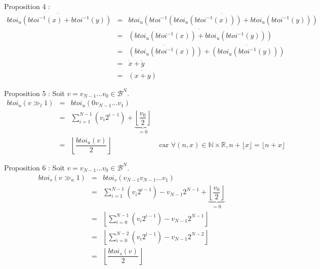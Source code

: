\documentclass[../main.tex]{subfiles}
\begin{document}
Proposition 4 :
\[
\begin{array}{lcl}
\dot{btoi_{u}(btoi^{-1}(x) + btoi^{-1}(y))} & = & \dot{btoi_{u}(btoi^{-1}(btoi_{u}(btoi^{-1}(x))) + btoi_{u}(btoi^{-1}(y)))} \\
 & = & \dot{(btoi_{u}(btoi^{-1}(x)) + btoi_{u}(btoi^{-1}(y)))} \\
 & = & \dot{(btoi_{u}(btoi^{-1}(x)))} + \dot{(btoi_{u}(btoi^{-1}(y)))} \\
 & = & \dot{x} + \dot{y} \\
 & = & \dot{(x + y)}
\end{array}
\]

Proposition 5 : Soit $v = v_{N-1}\dots v_{0}\in{\mathcal{B}^{N}}$.
\[
\begin{array}{lcll}
btoi_{u}(v\gg_{l}1)  & = & btoi_{u}(0v_{N-1}\dots v_{1}) \\
& = & \displaystyle\sum_{i = 1}^{N-1}(v_{i}2^{i-1}) + \underbrace{\left\lfloor\dfrac{v_{0}}{2}\right\rfloor}_{=0} \\
& = &  \left\lfloor\dfrac{btoi_{u}(v)}{2}\right\rfloor & \text{ car $\forall{(n, x)}\in{\mathbb{N}\times{\mathbb{R}}}, n + \lfloor{x}\rfloor = \lfloor{n + x}\rfloor$}
\end{array}
\]

Proposition 6 : Soit $v = v_{N-1}\dots v_{0}\in{\mathcal{B}^{N}}$.
\[
\begin{array}{lcl}
btoi_{s}(v\gg_{a}1)  & = & btoi_{s}(v_{N-1}v_{N-1}\dots v_{1}) \\
& = & \displaystyle\sum_{i = 1}^{N-1}(v_{i}2^{i-1}) - v_{N-1}2^{N-1} + \underbrace{\left\lfloor\dfrac{v_{0}}{2}\right\rfloor}_{=0} \\
& = &  \left\lfloor{\displaystyle\sum_{i = 0}^{N-1}(v_{i}2^{i-1}) - v_{N-1}2^{N-1}}\right\rfloor \\
& = &  \left\lfloor{\displaystyle\sum_{i = 0}^{N-2}(v_{i}2^{i-1}) - v_{N-1}2^{N-2}}\right\rfloor \\
& = & \left\lfloor\dfrac{btoi_{s}(v)}{2}\right\rfloor
\end{array}
\]
\end{document}
